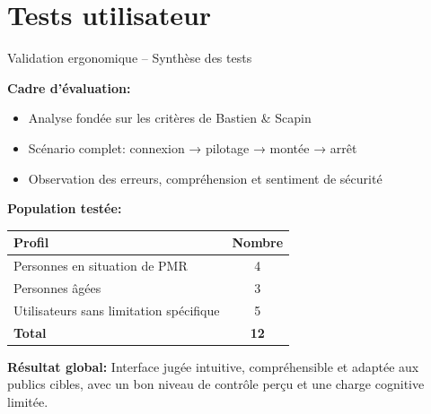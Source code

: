 \documentclass[10pt,aspectratio=169]{beamer}
\begin{document}
\section{Tests utilisateur}
\begin{frame}{Validation ergonomique – Synthèse des tests}

\textbf{Cadre d’évaluation:}
\begin{itemize}
    \item Analyse fondée sur les critères de Bastien \& Scapin
    \item Scénario complet: connexion → pilotage → montée → arrêt
    \item Observation des erreurs, compréhension et sentiment de sécurité
\end{itemize}

\vspace{0.5cm}

\textbf{Population testée:}

\begin{center}
\begin{tabular}{|l|c|}
\hline
\textbf{Profil} & \textbf{Nombre} \\
\hline
Personnes en situation de PMR & 4 \\
Personnes âgées & 3 \\
Utilisateurs sans limitation spécifique & 5 \\
\hline
\textbf{Total} & \textbf{12} \\
\hline
\end{tabular}
\end{center}

\vspace{0.4cm}

\textbf{Résultat global:}
Interface jugée intuitive, compréhensible et adaptée aux publics cibles,
avec un bon niveau de contrôle perçu et une charge cognitive limitée.

\end{frame}

\end{document}
